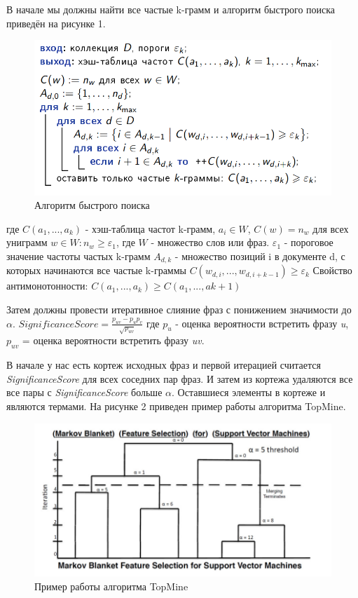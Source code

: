 В начале мы должны найти все частые k-грамм и алгоритм быстрого поиска приведён на рисунке 1.
\begin{figure}
    \includegraphics[scale = 0.5]{chapters/rules/images/ml1.png}
    \caption{Алгоритм быстрого поиска}
\end{figure}
где $C(a_{1},...,a_{k})$ - хэш-таблица частот k-грамм, $a_{i} \in W$, $C(w) = n_{w}$ для всех униграмм $w \in W: n_{w} \geq \varepsilon_{1}$, где $W$ - множество слов или фраз.
$\varepsilon_{1}$ - пороговое значение частоты частых k-грамм
$A_{d,k}$ - множество позиций i в документе d, с которых начинаются все частые k-граммы
$C(w_{d,i},...,w_{d,i+k-1}) \geq \varepsilon_{k}$
Свойство антимонотонности: $C(a_{1},...,a_{k}) \geq C(a_{1},...,a{k+1})$

Затем должны провести итеративное слияние фраз с понижением значимости до $\alpha$.
$SignificanceScore = \frac{p_{uv}-p_{u}p_{v}}{\sqrt{p_{uv}}}$
где $p_{u}$ - оценка вероятности встретить фразу \textit{u}, $p_{uv}$ = оценка вероятности встретить фразу \textit{uv}.

В начале у нас есть кортеж исходных фраз и первой итерацией считается \textit{SignificanceScore} для всех соседних пар фраз. И затем из кортежа удаляются все все пары с \textit{SignificanceScore} больше $\alpha$. Оставшиеся элементы в кортеже и являются термами. На рисунке 2 приведен пример работы алгоритма TopMine.
\begin{figure}
    \includegraphics[scale = 0.5]{chapters/rules/images/ml2.png}
    \caption{Пример работы алгоритма TopMine}
\end{figure}
